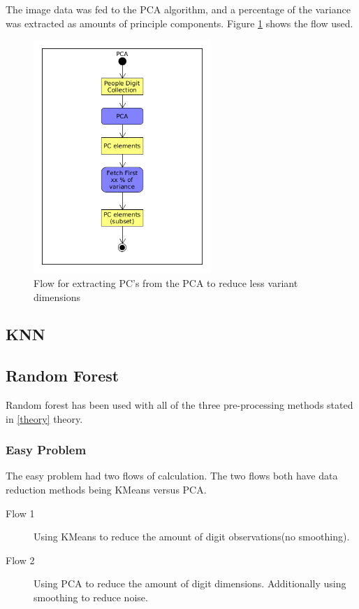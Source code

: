\documentclass[report]{subfiles}
\begin{document}
The image data was fed to the PCA algorithm, and a percentage of the variance was extracted as amounts of principle components. Figure \ref{fig:pca} shows the flow used.

\begin{figure}
  \centering
  \includegraphics[width=0.6\textwidth]{UML/PCA}
  \caption{Flow for extracting PC's from the PCA to reduce less variant dimensions}
  \label{fig:pca}
\end{figure}

\subsection{KNN}
\label{sec:impKNN}

\subsection{Random Forest}
\label{sec:impRandomForest}
Random forest has been used with all of the three pre-processing methods stated in \ref{theory} \refname{theory}.

\subsubsection{Easy Problem}

The easy problem had two flows of calculation. The two flows both have data reduction methods being KMeans versus PCA.

\begin{description}
\item[Flow 1] Using KMeans to reduce the amount of digit observations(no smoothing).
\item[Flow 2] Using PCA to reduce the amount of digit dimensions. Additionally using smoothing to reduce noise.
\end{description}
\end{document}
